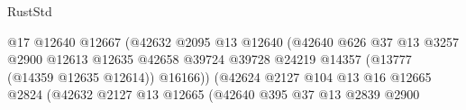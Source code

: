 \begin{lexlean}{RustStd}
\begin{coremodule}
                                                          @17
                                                          @12640
                                                          @12667
                                                          (@42632
                                                            @2095
                                                            @13
                                                            @12640
                                                            (@42640
                                                              @626
                                                              @37
                                                              @13
                                                              @3257
                                                              @2900
                                                              @12613
                                                              @12635
                                                              @42658
                                                              @39724
                                                              @39728
                                                              @24219
                                                              @14357
                                                              (@13777 (@14359 @12635 @12614))
                                                              @16166))
                                                          (@42624
                                                            @2127
                                                            @104
                                                            @13
                                                            @16
                                                            @12665
                                                            @2824
                                                            (@42632
                                                              @2127
                                                              @13
                                                              @12665
                                                              (@42640
                                                                @395
                                                                @37
                                                                @13
                                                                @2839
                                                                @2900

\end{coremodule}
\end{lexlean}
